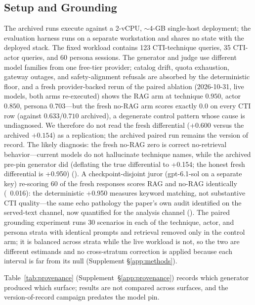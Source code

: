 \subsection{Setup and Grounding}
\label{sec:setup}
The archived runs execute against a 2-vCPU, ${\sim}4$-GB single-host
deployment; the evaluation harness runs on a separate workstation and shares
no state with the deployed stack. The fixed
workload contains 123 CTI-technique queries, 35 CTI-actor queries, and 60
persona sessions. The generator and judge use different model families from
one free-tier provider; catalog drift, quota exhaustion, gateway outages,
and safety-alignment refusals are absorbed by the deterministic floor, and a fresh provider-backed rerun of the paired ablation (2026-10-31,
live models, both arms re-executed) shows the RAG arm at technique
$0.950$, actor $0.850$, persona $0.703$---but the fresh no-RAG arm
scores exactly $0.0$ on every CTI row (against $0.633$/$0.710$
archived), a degenerate control pattern whose cause is undiagnosed. We
therefore do not read the fresh differential ($+0.600$ versus the
archived $+0.154$) as a replication; the archived paired run remains the version of record. The likely diagnosis: the fresh no-RAG zero is correct no-retrieval
behavior---current models do not hallucinate technique names, while the
archived pre-pin generator did (deflating the true differential to
+0.154; the honest fresh differential is +0.950)
(). A
checkpoint-disjoint juror (gpt-6.1-sol on a separate key) re-scoring 60
of the fresh responses scores RAG and no-RAG identically (~0.016): the
deterministic +0.950 measures keyword matching, not substantive CTI
quality---the same echo pathology the paper's own audit identified on
the served-text channel, now quantified for the analysis channel
(). The paired grounding
experiment runs 30 scenarios in each of the technique, actor, and persona
strata with identical prompts and retrieval removed only in the control
arm; it is balanced across strata while the live workload is not, so the
two are different estimands and no cross-stratum correction is applied
because each interval is far from its null (Supplement
\S\ref{app:methods}).

Table~\ref{tab:provenance} (Supplement~\S\ref{app:provenance}) records
which generator produced which surface; results are not compared across
surfaces, and the version-of-record campaign predates the model pin.

